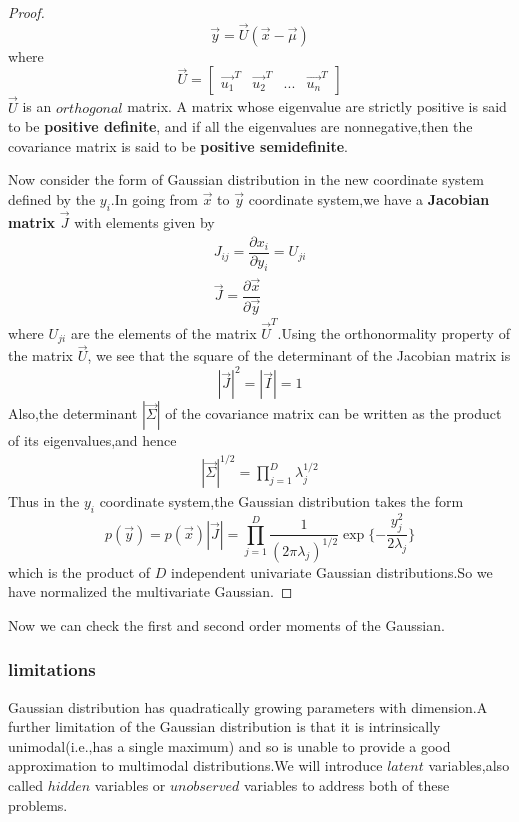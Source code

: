 \begin{proof}
	\begin{equation}
	\vec{y} = \vec{U}(\vec{x}-\vec{\mu})
	\end{equation}
	where
	\begin{equation}
	\vec{U} = \begin{bmatrix}
	\vec{u_1}^T & \vec{u_2}^T&...&\vec{u_n}^T
	\end{bmatrix}
	\end{equation}
	$\vec{U}$ is an $orthogonal$ matrix.
	A matrix whose eigenvalue are strictly positive is said to be \textbf{positive definite}, and if all the eigenvalues are nonnegative,then the covariance matrix is said to be \textbf{positive semidefinite}.
	
	Now consider  the form of Gaussian distribution in the new coordinate system defined by the $y_i$.In going from $\vec{x}$ to $\vec{y}$ coordinate system,we have a \textbf{Jacobian matrix} $\vec{J}$ with elements given by
	\begin{eqnarray}
	J_{ij} = \dfrac{\partial x_i}{\partial y_i} = U_{ji}\\
	\vec{J} = \dfrac{\partial\vec{x}}{\partial\vec{y}}
	\end{eqnarray}
	where $U_{ji}$ are the elements of the matrix $\vec{U}^T$.Using the orthonormality property of the matrix $\vec{U}$, we see that the square of the determinant of the Jacobian matrix is
	\begin{equation}
	|\vec{J}|^2 = |\vec{I}| = 1
	\end{equation}
	Also,the determinant $|\vec{\Sigma}|$ of the covariance matrix can be written as the product of its eigenvalues,and hence
	\begin{eqnarray}
	|\vec{\Sigma}|^{1/2} = \prod_{j=1}^{D}\lambda_j^{1/2}
	\end{eqnarray}
	Thus in the $y_i$ coordinate system,the Gaussian distribution takes the form
	\begin{equation}
	p(\vec{y}) = p(\vec{x})|\vec{J}| = \prod_{j=1}^{D}\dfrac{1}{(2\pi \lambda_j)^{1/2}}\exp\{-\dfrac{y_j ^2}{2\lambda_j}\}
	\end{equation}
	which is the product of $D$ independent univariate Gaussian distributions.So we have normalized the multivariate Gaussian.
\end{proof}
Now we can check the first and second order moments of the Gaussian.

\subsubsection{limitations}
Gaussian distribution has quadratically growing parameters with dimension.A further limitation of the Gaussian distribution is that it is intrinsically unimodal(i.e.,has a single maximum) and so is unable to provide a good approximation to multimodal distributions.We will introduce $latent$ variables,also called $hidden$ variables or $unobserved$ variables to address both of these problems.

